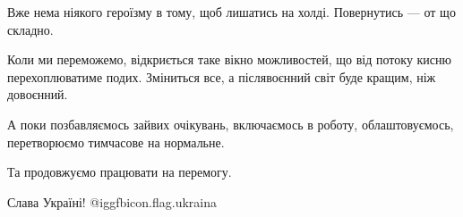 Вже нема ніякого героїзму в тому, щоб лишатись на холді. Повернутись — от що
складно.

Коли ми переможемо, відкриється таке вікно можливостей, що від потоку кисню
перехоплюватиме подих. Зміниться все, а післявоєнний світ буде кращим, ніж
довоєнний. 

А поки позбавляємось зайвих очікувань, включаємось в роботу, облаштовуємось,
перетворюємо тимчасове на нормальне.

Та продовжуємо працювати на перемогу.

Слава Україні! @igg{fbicon.flag.ukraina}

